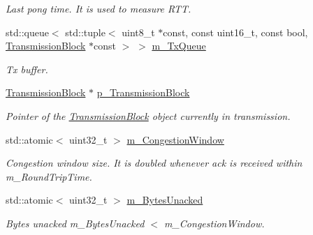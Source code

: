 \begin{DoxyCompactItemize}
\begin{DoxyCompactList}\small\item\em Last pong time. It is used to measure R\+TT. \end{DoxyCompactList}\item 
std\+::queue$<$ std\+::tuple$<$ uint8\+\_\+t $\ast$const, const uint16\+\_\+t, const bool, \hyperlink{class_network_coding_1_1_transmission_block}{Transmission\+Block} $\ast$const  $>$ $>$ \hyperlink{class_network_coding_1_1_transmission_session_a1cd636a998d235ce74ee38097792aac0}{m\+\_\+\+Tx\+Queue}\hypertarget{class_network_coding_1_1_transmission_session_a1cd636a998d235ce74ee38097792aac0}{}\label{class_network_coding_1_1_transmission_session_a1cd636a998d235ce74ee38097792aac0}

\begin{DoxyCompactList}\small\item\em Tx buffer. \end{DoxyCompactList}\item 
\hyperlink{class_network_coding_1_1_transmission_block}{Transmission\+Block} $\ast$ \hyperlink{class_network_coding_1_1_transmission_session_acc18d6b10a856b3dfda76c7b85899911}{p\+\_\+\+Transmission\+Block}\hypertarget{class_network_coding_1_1_transmission_session_acc18d6b10a856b3dfda76c7b85899911}{}\label{class_network_coding_1_1_transmission_session_acc18d6b10a856b3dfda76c7b85899911}

\begin{DoxyCompactList}\small\item\em Pointer of the \hyperlink{class_network_coding_1_1_transmission_block}{Transmission\+Block} object currently in transmission. \end{DoxyCompactList}\item 
std\+::atomic$<$ uint32\+\_\+t $>$ \hyperlink{class_network_coding_1_1_transmission_session_adbefe1608512aa1e65782ad6f49fed2e}{m\+\_\+\+Congestion\+Window}\hypertarget{class_network_coding_1_1_transmission_session_adbefe1608512aa1e65782ad6f49fed2e}{}\label{class_network_coding_1_1_transmission_session_adbefe1608512aa1e65782ad6f49fed2e}

\begin{DoxyCompactList}\small\item\em Congestion window size. It is doubled whenever ack is received within m\+\_\+\+Round\+Trip\+Time. \end{DoxyCompactList}\item 
std\+::atomic$<$ uint32\+\_\+t $>$ \hyperlink{class_network_coding_1_1_transmission_session_a27ee5813374da47482b72295b85548f4}{m\+\_\+\+Bytes\+Unacked}\hypertarget{class_network_coding_1_1_transmission_session_a27ee5813374da47482b72295b85548f4}{}\label{class_network_coding_1_1_transmission_session_a27ee5813374da47482b72295b85548f4}

\begin{DoxyCompactList}\small\item\em Bytes unacked m\+\_\+\+Bytes\+Unacked $<$ m\+\_\+\+Congestion\+Window. \end{DoxyCompactList}\end{DoxyCompactItemize}


